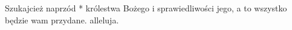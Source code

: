 Szukajcież naprzód * królestwa Bożego i sprawiedliwości jego, a to wszystko będzie wam przydane. alleluja.